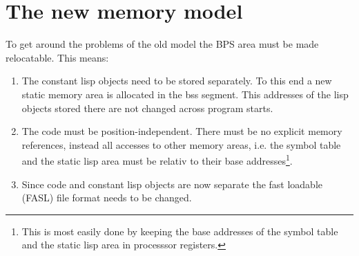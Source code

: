 \documentclass[a4paper]{article}
\begin{document}
\section{The new memory model}

To get around the problems of the old model the BPS area must be made
relocatable. This means:
\begin{enumerate}
\item The constant lisp objects need to be stored separately. To this
  end a new static memory area is allocated in the bss segment. This
  addresses of the lisp objects stored there are not changed across
  program starts.

\item The code must be position-independent. There must be no explicit
  memory references, instead all accesses to other memory areas, i.e.
  the symbol table and the static lisp area must be relativ to their
  base addresses\footnote{This is most easily done by keeping the base
  addresses of the symbol table and the static lisp area in processsor
  registers.}.

\item Since code and constant lisp objects are now separate the fast
  loadable (FASL) file format needs to be changed.
  
\end{enumerate}
\end{document}
